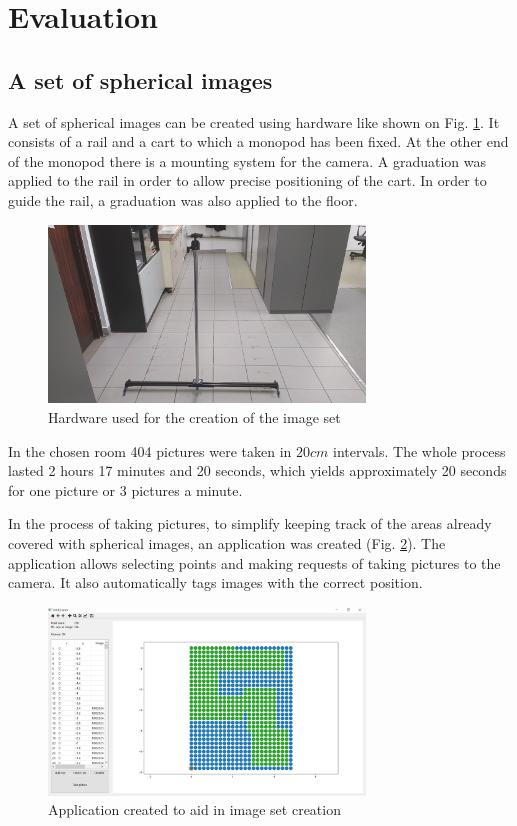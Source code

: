 \documentclass{svproc}
\begin{document}
\section{Evaluation}
\label{sec:evaluation}

\subsection{A set of spherical images}

A set of spherical images can be created using hardware like shown on Fig. \ref{fig:rig}.
It consists of a rail and a cart to which a monopod has been fixed.
At the other end of the monopod there is a mounting system for the camera.
A graduation was applied to the rail in order to allow precise positioning of the cart.
In order to guide the rail, a graduation was also applied to the floor.
\begin{figure}[!ht]
    \centering
    \includegraphics[width=0.75\textwidth]{img/rig/calosc.jpg}
    \caption{Hardware used for the creation of the image set}
    \label{fig:rig}
\end{figure}
In the chosen room 404 pictures were taken in $20 cm$ intervals.
The whole process lasted 2 hours 17 minutes and 20 seconds, which yields approximately 20 seconds for one picture or 3 pictures a minute.

In the process of taking pictures, to simplify keeping track of the areas already covered with spherical images, an application was created (Fig. \ref{fig:app}).
The application allows selecting points and making requests of taking pictures to the camera.
It also automatically tags images with the correct position.
\begin{figure}[!ht]
    \centering
    \includegraphics[width=0.75\textwidth]{img/creator.png}
    \caption{Application created to aid in image set creation}
    \label{fig:app}
\end{figure}
\end{document}
